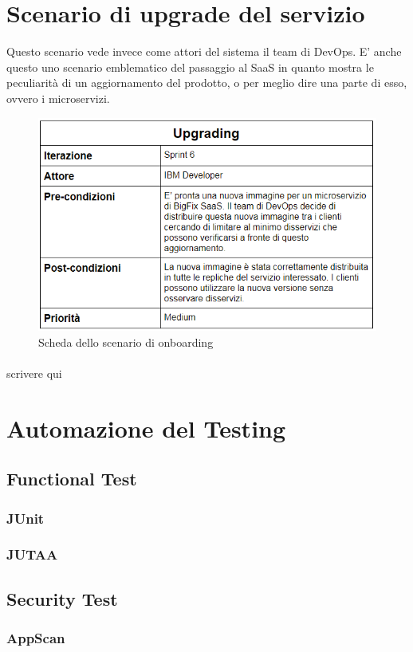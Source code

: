 \section{Scenario di upgrade del servizio}
Questo scenario vede invece come attori del sistema il team di DevOps. E' anche questo uno scenario emblematico del passaggio al SaaS in quanto mostra le peculiarità di un aggiornamento del prodotto, o per meglio dire una parte di esso, ovvero i microservizi.
\begin{figure}[h]
	\centering
	\includegraphics[width=0.7\linewidth]{capitoli/imgs/upgradescenarioScheda}
	\caption{Scheda dello scenario di onboarding}
	\label{fig:upgradescenarioscheda}
\end{figure}
\paragraph{}
scrivere qui
\section{Automazione del Testing}
\subsection{Functional Test}
\subsubsection{JUnit}
\subsubsection{JUTAA}
\subsection{Security Test}
\subsubsection{AppScan}
